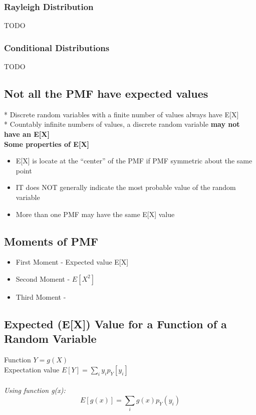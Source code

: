 \subsubsection{Rayleigh Distribution}
TODO
\subsubsection{Conditional Distributions}
TODO
\subsection{Not all the PMF have expected values}

* {\color{red}Discrete random variables with a finite number of values always have E[X]}\\
* {\color{red}Countably infinite numbers} of values, a discrete random variable \textbf{{\color{red}may not have an E[X]}}\\

\textbf{Some properties of E[X]}
\begin{itemize}
	\item E[X] is locate at the ``{\color{blue}center}'' of the PMF if PMF symmetric about the same point  
	\item IT does {\color{blue}NOT} generally indicate the most probable value of the random variable
	\item {\color{blue}More than one} PMF may have the same E[X] value
\end{itemize}

\subsection{Moments of PMF}
\begin{itemize}
	\item {\color{blue}First Moment} - Expected value E[X]
	\item {\color{blue}Second Moment} - $E[X^{2}]$
	\item {\color{blue}Third Moment} - 
\end{itemize}

\subsection{Expected (E[X]) Value for a Function of a Random Variable}

Function $Y=g(X)$\\
Expectation value $E[Y]=\sum_{i} y_{i}p_{Y}[y_{i}]$\\\\
\emph{Using function g(x):}
\begin{equation*}
	E[g(x)]=\sum_{i}g(x)p_{Y}(y_{i})
\end{equation*}

